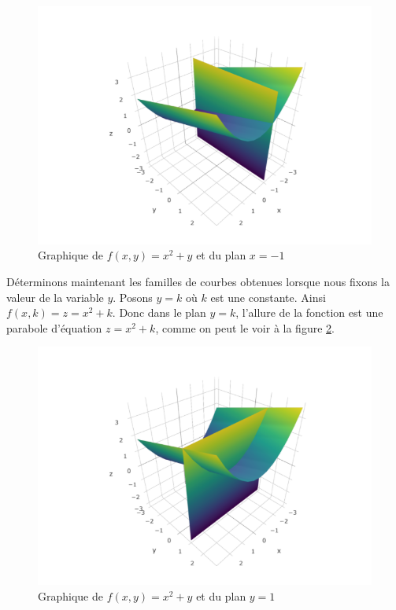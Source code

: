 \documentclass[]{book}
\theoremstyle{definition}
\theoremstyle{definition}
\theoremstyle{definition}
\theoremstyle{remark}
\begin{document}
\begin{figure}

{\centering \includegraphics[width=0.8\linewidth]{resources/images/fct_coupe_plan1} 

}

\caption{Graphique de $f(x,y)=x^2+y$ et du plan $x=-1$}\label{fig:fctcoupe1}
\end{figure}

Déterminons maintenant les familles de courbes obtenues lorsque nous
fixons la valeur de la variable \(y\). Posons \(y=k\) où \(k\) est une
constante. Ainsi \(f(x,k)=z=x^2+k\). Donc dans le plan \(y=k\), l'allure
de la fonction est une parabole d'équation \(z=x^2+k\), comme on peut le
voir à la figure \ref{fig:fctcoupe2}.

\begin{figure}

{\centering \includegraphics[width=0.8\linewidth]{resources/images/fct_coupe_plan2} 

}

\caption{Graphique de $f(x,y)=x^2+y$ et du plan $y=1$}\label{fig:fctcoupe2}
\end{figure}
\end{document}
